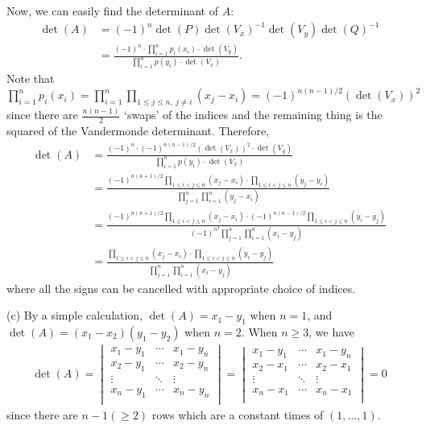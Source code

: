 \documentclass{homework}
\begin{document}
{Now, we can easily find the determinant of $A$:
\begin{align*}
    \det(A) & = (-1)^n \det(P) \det(V_x)^{-1} \det(V_y) \det(Q)^{-1}
    \\ &= \frac{(-1)^n \cdot \prod_{i=1}^n p_i(x_i) \cdot \det(V_y)}{\prod_{i=1}^n p(y_i) \cdot \det(V_x)}.
\end{align*}
Note that $\prod_{i=1}^n p_i(x_i) = \prod_{i=1}^n \prod_{1\le j\le n,\ j\ne i} (x_j - x_i) = (-1)^{n(n-1)/2} (\det(V_x))^2$ since there are $\frac{n(n-1)}2$ `swaps' of the indices and the remaining thing is the squared of the Vandermonde determinant. Therefore,
\begin{align*}
    \det(A) & = \frac{(-1)^n \cdot (-1)^{n(n-1)/2} (\det(V_x))^2 \cdot \det(V_y)}{\prod_{i=1}^n p(y_i) \cdot \det(V_x)}
    \\ &= \frac{(-1)^{n(n+1)/2} \prod_{1\le i<j\le n} (x_j - x_i) \cdot \prod_{1\le i<j\le n} (y_j - y_i)}{ \prod_{j=1}^n \prod_{i=1}^n (y_j - x_i) }
    \\ &= \frac{(-1)^{n(n+1)/2} \prod_{1\le i<j\le n} (x_j - x_i) \cdot (-1)^{n(n-1)/2} \prod_{1\le i<j\le n} (y_i - y_j)}{ (-1)^{n^2} \prod_{j=1}^n \prod_{i=1}^n (x_i - y_j) }
    \\ &= \frac{\prod_{1\le i<j\le n} (x_j - x_i) \cdot \prod_{1\le i<j\le n} (y_i - y_j)}{ \prod_{j=1}^n \prod_{i=1}^n (x_i - y_j) }
\end{align*}
where all the signs can be cancelled with appropriate choice of indices.

\noindent(c) By a simple calculation, $\det(A) = x_1-y_1$ when $n=1$, and $\det(A) = (x_1-x_2)(y_1-y_2)$ when $n=2$. When $n\ge 3$, we have
\begin{align*}
    \det(A) = \begin{vmatrix}
        x_1-y_1 & \cdots & x_1-y_n \\
        x_2-y_1 & \cdots & x_2-y_n \\
        \vdots  & \ddots & \vdots  \\
        x_n-y_1 & \cdots & x_n-y_n \\
    \end{vmatrix} = \begin{vmatrix}
        x_1-y_1 & \cdots & x_1-y_n \\
        x_2-x_1 & \cdots & x_2-x_1 \\
        \vdots  & \ddots & \vdots  \\
        x_n-x_1 & \cdots & x_n-x_1 \\
    \end{vmatrix} = 0
\end{align*}
since there are $n-1(\ge 2)$ rows which are a constant times of $(1,\dots,1)$.
}
\end{document}
